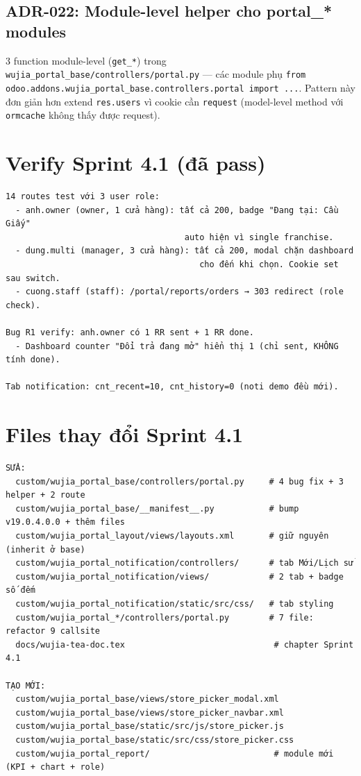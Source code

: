 \subsection{ADR-022: Module-level helper cho portal\_* modules}
3 function module-level (\texttt{get\_*}) trong \texttt{wujia\_portal\_base/controllers/portal.py} — các module phụ \texttt{from odoo.addons.wujia\_portal\_base.controllers.portal import ...}. Pattern này đơn giản hơn extend \texttt{res.users} vì cookie cần \texttt{request} (model-level method với \texttt{ormcache} không thấy được request).

\section{Verify Sprint 4.1 (đã pass)}

\begin{lstlisting}[style=shell]
14 routes test với 3 user role:
  - anh.owner (owner, 1 cửa hàng): tất cả 200, badge "Đang tại: Cầu Giấy"
                                    auto hiện vì single franchise.
  - dung.multi (manager, 3 cửa hàng): tất cả 200, modal chặn dashboard
                                       cho đến khi chọn. Cookie set sau switch.
  - cuong.staff (staff): /portal/reports/orders → 303 redirect (role check).

Bug R1 verify: anh.owner có 1 RR sent + 1 RR done.
  - Dashboard counter "Đổi trả đang mở" hiển thị 1 (chỉ sent, KHÔNG tính done).

Tab notification: cnt_recent=10, cnt_history=0 (noti demo đều mới).
\end{lstlisting}

\section{Files thay đổi Sprint 4.1}

\begin{lstlisting}[style=shell]
SỬA:
  custom/wujia_portal_base/controllers/portal.py     # 4 bug fix + 3 helper + 2 route
  custom/wujia_portal_base/__manifest__.py           # bump v19.0.4.0.0 + thêm files
  custom/wujia_portal_layout/views/layouts.xml       # giữ nguyên (inherit ở base)
  custom/wujia_portal_notification/controllers/      # tab Mới/Lịch sử
  custom/wujia_portal_notification/views/            # 2 tab + badge số đếm
  custom/wujia_portal_notification/static/src/css/   # tab styling
  custom/wujia_portal_*/controllers/portal.py        # 7 file: refactor 9 callsite
  docs/wujia-tea-doc.tex                              # chapter Sprint 4.1

TẠO MỚI:
  custom/wujia_portal_base/views/store_picker_modal.xml
  custom/wujia_portal_base/views/store_picker_navbar.xml
  custom/wujia_portal_base/static/src/js/store_picker.js
  custom/wujia_portal_base/static/src/css/store_picker.css
  custom/wujia_portal_report/                         # module mới (KPI + chart + role)
\end{lstlisting}

